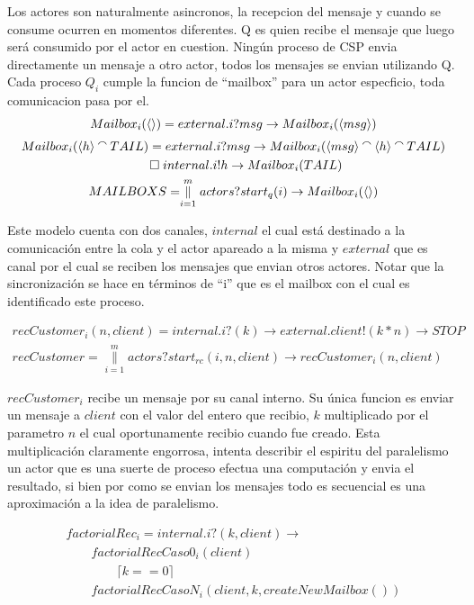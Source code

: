 \documentclass[fleqn]{article}
\newcommand{\myList}[1]{\langle #1 \rangle}
\newcommand{\myCons}[0]{\mathbin{\raise 0.8ex\hbox{$\smallfrown$}}}
\newcommand{\paralleln}[2]{\overset{#2}{\underset{i = #1}{\parallel}}}
\begin{document}
Los actores son naturalmente asincronos, la recepcion del mensaje y cuando se consume ocurren en momentos diferentes. Q es quien recibe el mensaje que luego será consumido por el actor en cuestion. Ningún proceso de CSP envia directamente un mensaje a otro actor, todos los mensajes se envian utilizando Q. Cada proceso $Q_i$ cumple la funcion de ``mailbox'' para un actor especficio, toda comunicacion pasa por el. \\

\begin{gather*}
Mailbox_i(\myList{}) = external.i?msg \rightarrow Mailbox_i(\myList{msg}) \\
Mailbox_i(\myList{h} \myCons TAIL) = external.i?msg \rightarrow Mailbox_i(\myList{msg} \myCons \myList{h} \myCons TAIL) \\ 
\qquad \square \; internal.i!h \rightarrow Mailbox_i(TAIL) \\  
MAILBOXS = \paralleln{1}{m} actors?start_q(i) \rightarrow Mailbox_i(\myList{})
\end{gather*}

Este modelo cuenta con dos canales, $internal$ el cual está destinado a la comunicación entre la cola y el actor apareado a la misma y $external$ que es canal por el cual se reciben los mensajes que envian otros actores. Notar que la sincronización se hace en términos de ``i'' que es el mailbox con el cual es identificado este proceso.

\begin{gather*}
recCustomer_i(n, client) = internal.i?(k) \rightarrow external.client!(k*n) \rightarrow STOP \\
recCustomer = \paralleln{1}{m} actors?start_{rc}(i, n, client) \rightarrow recCustomer_i(n, client)
\end{gather*}

$recCustomer_i$ recibe un mensaje por su canal interno. Su única funcion es enviar un mensaje a $client$ con el valor del entero que recibio, $k$ multiplicado por el parametro $n$ el cual oportunamente recibio cuando fue creado. Esta multiplicación claramente engorrosa, intenta describir el espiritu del paralelismo un actor que es una suerte de proceso efectua una computación y envia el resultado, si bien por como se envian los mensajes todo es secuencial es una aproximación a la idea de paralelismo.

\begin{gather*} 
factorialRec_i = internal.i?(k,client) \rightarrow \\
\qquad factorialRecCaso0_i(client) \\
\qquad \qquad \lceil k == 0 \rceil \\
\qquad factorialRecCasoN_i(client, k, createNewMailbox())
\end{gather*}
\end{document}
